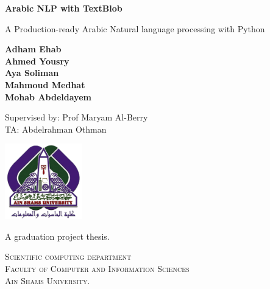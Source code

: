 \begin{titlepage}
    \begin{center}
        \vspace*{0.9cm}
        
        \Huge
        \textbf{Arabic NLP with TextBlob}
        
        \vspace{0.5cm}
        
        \LARGE
        A Production-ready Arabic Natural language processing with Python 
        
        \vspace{1.5cm}
        
        \Large
        \textbf{Adham Ehab} \\
        \textbf{Ahmed Yousry}\\
        \textbf{Aya Soliman}\\
        \textbf{Mahmoud Medhat}\\
        \textbf{Mohab Abdeldayem}\\
        
        \vspace{0.5cm}
        
        Supervised by: Prof Maryam Al-Berry \\
                       TA: Abdelrahman Othman\\
        
        
        \vspace{0.3cm}
        
        \includegraphics[width=0.25\textwidth]{Images/fcis_logo.png}
        
        \vspace{0.8cm}
        
        \Large
        A graduation project thesis.
        
        \vspace{0.5cm}
        
        \LARGE
	    \textsc{Scientific computing department\\
	    Faculty of Computer and Information Sciences\\
        Ain Shams University.}
    \end{center}
\end{titlepage}